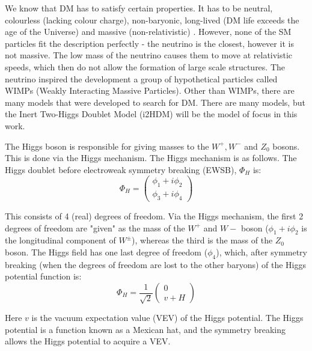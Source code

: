 \documentclass[12pt]{article}
\begin{document}
We know that DM has to satisfy certain properties. It has to be neutral, colourless (lacking colour charge), non-baryonic, long-lived (DM life exceeds the age of the Universe) and massive (non-relativistic) \cite{ZACEK_2007, DeLuca2018, gondolo2004introductionnonbaryonicdarkmatter}. However, none of the SM particles fit the description perfectly - the neutrino is the closest, however it is not massive. The low mass of the neutrino causes them to move at relativistic speeds, which then do not allow the formation of large scale structures. The neutrino inspired the development a group of hypothetical particles called WIMPs (Weakly Interacting Massive Particles). Other than WIMPs, there are many models that were developed to search for DM. There are many models, but the Inert Two-Higgs Doublet Model (i2HDM) will be the model of focus in this work. 

The Higgs boson is responsible for giving masses to the $W^+, W^-$ and $Z_0$ bosons. This is done via the Higgs mechanism. The Higgs mechanism is as follows.
The Higgs doublet before electroweak symmetry breaking (EWSB), $\Phi_H$ is:
\begin{equation}
    \Phi_H =
    \begin{pmatrix}
        {\phi_1 + i\phi_2} \\
        {\phi_3 + i\phi_4}
    \end{pmatrix}
\end{equation}

This consists of 4 (real) degrees of freedom. Via the Higgs mechanism, the first 2 degrees of freedom are "given" as the mass of the $W^+$ and $W-$ boson ($\phi_1 + i\phi_2$ is the longitudinal component of $W^\pm$), whereas the third is the mass of the $Z_0$ boson. The Higgs field has one last degree of freedom ($\phi_4$), which, after symmetry breaking (when the degrees of freedom are lost to the other baryons) of the Higgs potential function is: 
\begin{equation}
    \Phi_H = \frac{1}{\sqrt{2}}
    \begin{pmatrix}
        {0} \\
        {v + H}
    \end{pmatrix}
\end{equation}

Here $v$ is the vacuum expectation value (VEV) of the Higgs potential. The Higgs potential is a function known as a Mexican hat, and the symmetry breaking allows the Higgs potential to acquire a VEV.
\end{document}
